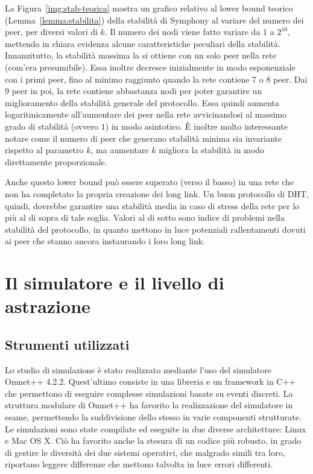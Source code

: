 \documentclass[prodmode,acmtap]{acmlarge}
\begin{document}
La Figura~\ref{img:stab-teorica} mostra un grafico relativo al lower bound teorico (Lemma~\ref{lemma:stabilita}) della stabilità di Symphony al variare del numero dei peer, per diversi valori di $k$. Il numero dei nodi viene fatto variare da $1$ a $2^{10}$, mettendo in chiara evidenza alcune caratteristiche peculiari della stabilità. Innanzitutto, la stabilità massima la si ottiene con un solo peer nella rete (com'era presumibile). Essa inoltre decresce inizialmente in modo esponenziale con i primi peer, fino al minimo raggiunto quando la rete contiene 7 o 8 peer. Dai 9 peer in poi, la rete contiene abbastanza nodi per poter garantire un miglioramento della stabilità generale del protocollo. Essa quindi aumenta logaritmicamente all'aumentare dei peer nella rete avvicinandosi al massimo grado di stabilità (ovvero $1$) in modo asintotico. È inoltre molto interessante notare come il numero di peer che generano stabilità minima sia invariante rispetto al parametro $k$, ma aumentare $k$ migliora la stabilità in modo direttamente proporzionale. 

Anche questo lower bound può essere superato (verso il basso) in una rete che non ha completato la propria creazione dei long link. Un buon protocollo di DHT, quindi, dovrebbe garantire una stabilità media in caso di stress della rete per lo più al di sopra di tale soglia. Valori al di sotto sono indice di problemi nella stabilità del protocollo, in quanto mettono in luce potenziali rallentamenti dovuti ai peer che stanno ancora instaurando i loro long link.












\section{Il simulatore e il livello di astrazione} \label{simulatore}

\subsection{Strumenti utilizzati}

Lo studio di simulazione è stato realizzato mediante l'uso del simulatore Omnet++ 4.2.2\cite{omnet++}. Quest'ultimo consiste in una libreria e un framework in C++ che permettono di eseguire complesse simulazioni basate su eventi discreti. La struttura modulare di Omnet++ ha favorito la realizzazione del simulatore in esame, permettendo la suddivisione dello stesso in varie componenti strutturate. Le simulazioni sono state compilate ed eseguite in due diverse architetture: Linux e Mac OS X. Ciò ha favorito anche la stesura di un codice più robusto, in grado di gestire le diversità dei due sistemi operativi, che malgrado simili tra loro, riportano leggere differenze che mettono talvolta in luce errori differenti.
\end{document}
